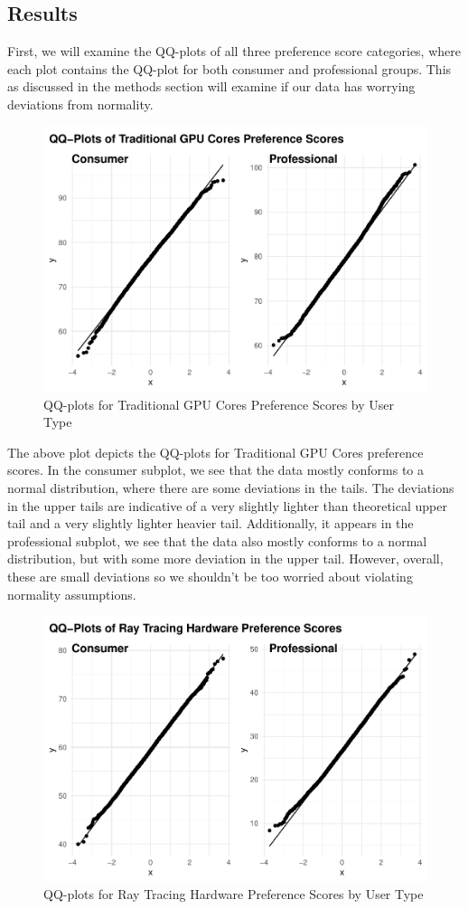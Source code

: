 \documentclass[
]{article}
\begin{document}
\hypertarget{results}{%
\subsection{Results}\label{results}}

First, we will examine the QQ-plots of all three preference score
categories, where each plot contains the QQ-plot for both consumer and
professional groups. This as discussed in the methods section will
examine if our data has worrying deviations from normality.

\begin{figure}

{\centering \includegraphics[width=0.6\linewidth,]{Assignment1_files/figure-latex/unnamed-chunk-11-1} 

}

\caption{QQ-plots for Traditional GPU Cores Preference Scores by User Type}\label{fig:unnamed-chunk-11}
\end{figure}

The above plot depicts the QQ-plots for Traditional GPU Cores preference
scores. In the consumer subplot, we see that the data mostly conforms to
a normal distribution, where there are some deviations in the tails. The
deviations in the upper tails are indicative of a very slightly lighter
than theoretical upper tail and a very slightly lighter heavier tail.
Additionally, it appears in the professional subplot, we see that the
data also mostly conforms to a normal distribution, but with some more
deviation in the upper tail. However, overall, these are small
deviations so we shouldn't be too worried about violating normality
assumptions.

\begin{figure}

{\centering \includegraphics[width=0.6\linewidth,]{Assignment1_files/figure-latex/unnamed-chunk-12-1} 

}

\caption{QQ-plots for Ray Tracing Hardware Preference Scores by User Type}\label{fig:unnamed-chunk-12}
\end{figure}
\end{document}
